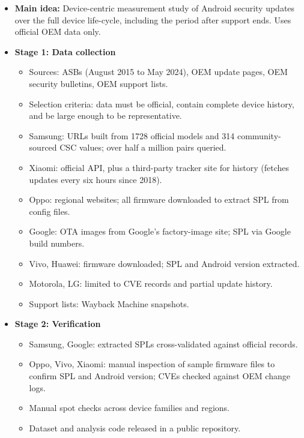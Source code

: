 \documentclass[11pt,a4paper]{article}
\begin{document}
\begin{enumerate}
    \begin{itemize}[leftmargin=*,itemsep=1pt,topsep=2pt]
        \item \textbf{Main idea:} Device-centric measurement study of Android security updates over the full device life-cycle, including the period after support ends. Uses official OEM data only.
        \item \textbf{Stage 1: Data collection}
        \begin{itemize}[itemsep=0pt]
            \item Sources: ASBs (August 2015 to May 2024), OEM update pages, OEM security bulletins, OEM support lists.
            \item Selection criteria: data must be official, contain complete device history, and be large enough to be representative.
            \item Samsung: URLs built from 1728 official models and 314 community-sourced CSC values; over half a million pairs queried.
            \item Xiaomi: official API, plus a third-party tracker site for history (fetches updates every six hours since 2018).
            \item Oppo: regional websites; all firmware downloaded to extract SPL from config files.
            \item Google: OTA images from Google's factory-image site; SPL via Google build numbers.
            \item Vivo, Huawei: firmware downloaded; SPL and Android version extracted.
            \item Motorola, LG: limited to CVE records and partial update history.
            \item Support lists: Wayback Machine snapshots.
        \end{itemize}
        \item \textbf{Stage 2: Verification}
        \begin{itemize}[itemsep=0pt]
            \item Samsung, Google: extracted SPLs cross-validated against official records.
            \item Oppo, Vivo, Xiaomi: manual inspection of sample firmware files to confirm SPL and Android version; CVEs checked against OEM change logs.
            \item Manual spot checks across device families and regions.
            \item Dataset and analysis code released in a public repository.
        \end{itemize}

\end{itemize}
\end{enumerate}
\end{document}
